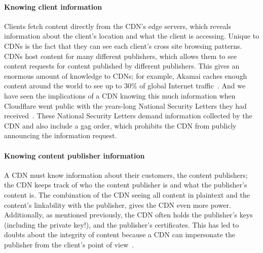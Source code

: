 
\paragraph{Knowing client information} Clients fetch content directly from the CDN's edge servers, which reveals 
information about the client's location and what the client is accessing.  Unique to CDNs is the fact that 
they can see each client's cross site browsing patterns.  CDNs host content for many different publishers, which allows 
them to see content requests for content published by different publishers.  This gives an enormous amount of 
knowledge to CDNs; for example, Akamai caches enough content around the world to see up to 30\% of global Internet 
traffic~\cite{akamai_global_traffic}.  And we have seen the implications of a CDN knowing this much information when Cloudflare 
went public with the years-long National Security Letters they had received~\cite{cloudflare_nsl}. These National Security Letters 
demand information collected by the CDN and also include a gag order, which prohibits the CDN from publicly announcing 
the information request.  

\paragraph{Knowing content publisher information} A CDN must know information
about their customers, the content
publishers; the CDN keeps track of who the content publisher is and 
what the publisher's content is.  The combination of the CDN seeing all content in plaintext and the content's 
linkability with the publisher, gives the CDN even more power.  Additionally, as mentioned previously, the CDN often 
holds the publisher's keys (including the private key!), and the publisher's certificates.  This has led to doubts 
about the integrity of content because a CDN can impersonate the publisher from the client's point of view~\cite{levy2015stickler}.

